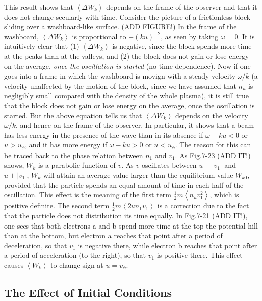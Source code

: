 \documentclass[
  notoc %
]{tufte-book}
\begin{document}
This result shows that \(\left<\Delta W_k\right>\) depends on the frame
of the observer and that it does not change secularly with time.
Consider the picture of a frictionless block sliding over a
washboard-like surface. (ADD FIGURE!) In the frame of the washboard,
\(\left<\Delta W_k \right>\) is proportional to \(-(ku)^{-2}\), as seen
by taking \(\omega = 0\). It is intuitively clear that (1)
\(\left<\Delta W_k \right>\) is negative, since the block spends more
time at the peaks than at the valleys, and (2) the block does not gain
or lose energy on the average, \emph{once the oscillation is started}
(no time-dependence). Now if one goes into a frame in which the
washboard is movign with a steady velocity \(\omega/k\) (a velocity
unaffected by the motion of the block, since we have assumed that
\(n_u\) is negligibly small compared with the density of the whole
plasma), it is still true that the block does not gain or lose energy on
the average, once the oscillation is started. But the above equation
tells us that \(\left<\Delta W_k\right>\) depends on the velocity
\(\omega/k\), and hence on the frame of the observer. In particular, it
shows that a beam has less energy in the presence of the wave than in
its absence if \(\omega - ku<0\) or \(u>u_\phi\), and it has more energy
if \(\omega - ku>0\) or \(u<u_\phi\). The reason for this can be traced
back to the phase relation between \(n_1\) and \(v_1\). As Fig.7-23 (ADD
IT!) shows, \(W_k\) is a parabolic function of \(v\). As \(v\)
oscillates between \(u-|v_1|\) and \(u+|v_1|\), \(W_k\) will attain an
average value larger than the equilibrium value \(W_{k0}\), provided
that the particle spends an equal amount of time in each half of the
oscillation. This effect is the meaning of the first term
\(\frac{1}{2}m\left< n_uv_1^2 \right>\), which is positive definite. The
second term \(\frac{1}{2}m\left< 2un_1v_1 \right>\) is a correction due
to the fact that the particle does not distribution its time equally. In
Fig.7-21 (ADD IT!), one sees that both electrons a and b spend more time
at the top the potential hill than at the bottom, but electron a reaches
that point after a period of deceleration, so that \(v_1\) is negative
there, while electron b reaches that point after a period of
acceleration (to the right), so that \(v_1\) is positive there. This
effect causes \(\left<W_k\right>\) to change sign at \(u=v_\phi\).

\hypertarget{the-effect-of-initial-conditions}{%
\subsection{The Effect of Initial
Conditions}\label{the-effect-of-initial-conditions}}
\end{document}
